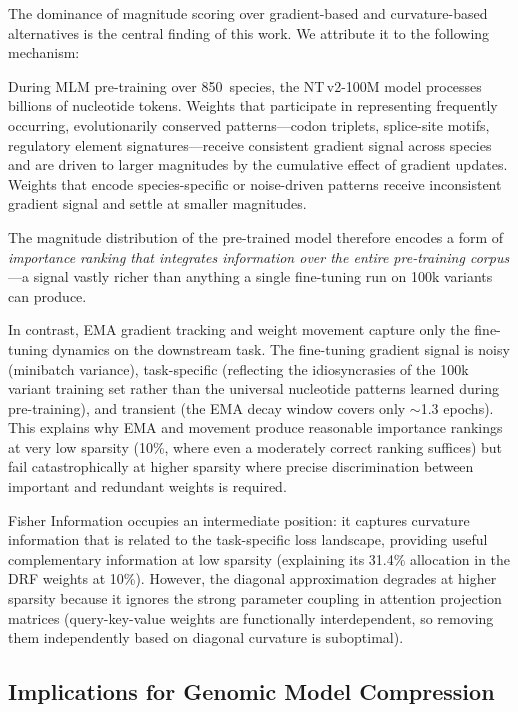 \documentclass[journal]{IEEEtran}
\newcommand{\ntv}{NT\,v2-100M}
\begin{document}
The dominance of magnitude scoring over gradient-based and
curvature-based alternatives is the central finding of this
work.
We attribute it to the following mechanism:

During MLM pre-training over 850~species, the \ntv{} model
processes billions of nucleotide tokens.
Weights that participate in representing frequently occurring,
evolutionarily conserved patterns---codon triplets, splice-site
motifs, regulatory element signatures---receive consistent
gradient signal across species and are driven to larger
magnitudes by the cumulative effect of gradient updates.
Weights that encode species-specific or noise-driven patterns
receive inconsistent gradient signal and settle at smaller
magnitudes.

The magnitude distribution of the pre-trained model therefore
encodes a form of \emph{importance ranking that integrates
information over the entire pre-training corpus}---a signal
vastly richer than anything a single fine-tuning run on 100k
variants can produce.

In contrast, EMA gradient tracking and weight movement capture
only the fine-tuning dynamics on the downstream task.
The fine-tuning gradient signal is noisy (minibatch variance),
task-specific (reflecting the idiosyncrasies of the 100k
variant training set rather than the universal nucleotide
patterns learned during pre-training), and transient
(the EMA decay window covers only $\sim$1.3 epochs).
This explains why EMA and movement produce reasonable
importance rankings at very low sparsity (10\%, where even
a moderately correct ranking suffices) but fail catastrophically
at higher sparsity where precise discrimination between
important and redundant weights is required.

Fisher Information occupies an intermediate position: it
captures curvature information that is related to the
task-specific loss landscape, providing useful complementary
information at low sparsity (explaining its 31.4\% allocation
in the DRF weights at 10\%).
However, the diagonal approximation degrades at higher sparsity
because it ignores the strong parameter coupling in attention
projection matrices (query-key-value weights are functionally
interdependent, so removing them independently based on
diagonal curvature is suboptimal).

\subsection{Implications for Genomic Model Compression}
\end{document}
